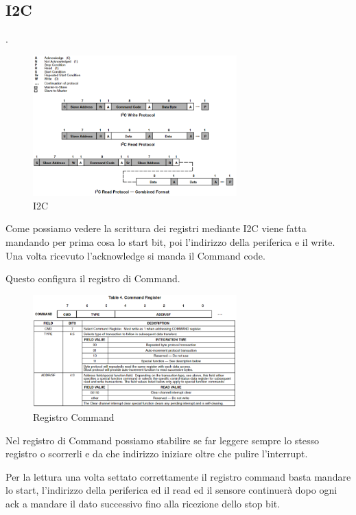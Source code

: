 \documentclass[12pt]{report}
\begin{document}
\subsection{I2C}.

\begin{figure}[H]
    \centering
    \includegraphics[width=0.70\textwidth]{images/Immagini sensore/I2C.png}
    \caption{I2C}
\end{figure}

Come possiamo vedere la scrittura dei registri mediante I2C viene fatta mandando per prima cosa lo start bit, poi l'indirizzo della periferica e il write.
Una volta ricevuto l'acknowledge si manda il Command code. 
 
Questo configura il registro di Command.

\begin{figure}[H]
    \centering
    \includegraphics[width=0.7\textwidth]{images/Immagini sensore/registro di command.png}
    \caption{Registro Command}
    \label{fig:comm}
\end{figure}

Nel registro di Command possiamo stabilire se far leggere sempre lo stesso registro o scorrerli e da che indirizzo iniziare oltre che pulire l'interrupt.

Per la lettura una volta settato correttamente il registro command basta mandare lo start, l'indirizzo della periferica ed il read ed il sensore continuerà dopo ogni ack a mandare il dato successivo fino alla ricezione dello stop bit.
\end{document}
